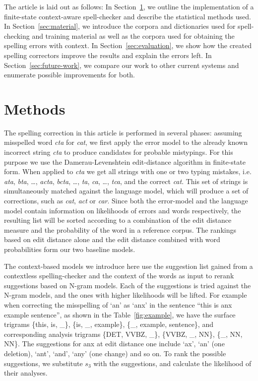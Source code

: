 \documentclass{llncs}
\begin{document}
The article is laid out as follows: In Section~\ref{sec:methods}, we outline
the implementation of a finite-state context-aware spell-checker and describe
the statistical methods used.  In Section~\ref{sec:material}, we introduce the
corpora and dictionaries used for spell-checking and training material as well
as the corpora used for obtaining the spelling errors with context. In
Section~\ref{sec:evaluation}, we show how the created spelling correctors
improve the results and explain the errors left. In
Section~\ref{sec:future-work}, we compare our work to other current systems and
enumerate possible improvements for both.

\section{Methods}
\label{sec:methods}

The spelling correction in this article is performed in several phases:
assuming misspelled word \emph{cta} for \emph{cat}, we first apply the error
model to the already known incorrect string \emph{cta} to produce candidates
for probable mistypings. For this purpose we use the Damerau-Levenshtein
edit-distance algorithm in finite-state form. When applied to \emph{cta} we get
all strings with one or two typing mistakes, i.e. \emph{ata}, \emph{bta},
\ldots, \emph{acta}, \emph{bcta}, \ldots, \emph{ta}, \emph{ca}, \ldots,
\emph{tca}, and the correct \emph{cat}. This set of strings is simultaneously
matched against the language model, which will produce a set of corrections,
such as \emph{cat}, \emph{act} or \emph{car}. Since both the error-model and
the language model contain information on likelihoods of errors and words
respectively, the resulting list will be sorted according to a combination of
the edit distance measure and the probability of the word in a reference
corpus.  The rankings based on edit distance alone and the edit distance
combined with word probabilities form our two baseline models. 

The context-based models we introduce here use the suggestion list gained from
a contextless spelling-checker and the context of the words as input to rerank
suggestions based on N-gram models. Each of the suggestions is tried against
the N-gram models, and the ones with higher likelihoods will be lifted.  For
example when correcting the misspelling of `an' as `anx' in the sentence ``this
is anx example sentence'', as shown in the Table~\ref{fig:example}, we have the
surface trigrams \{this, is, \_\}, \{is, \_, example\}, \{\_, example,
sentence\}, and corresponding analysis trigrams \{DET, VVBZ, \_\}, \{VVBZ, \_,
NN\}, \{\_, NN, NN\}. The suggestions for anx at edit distance one include
`ax', `an' (one deletion), `ant', `and', `any' (one change) and so on. To rank
the possible suggestions, we substitute $s_3$ with the suggestions, and
calculate the likelihood of their analyses. 
\end{document}
